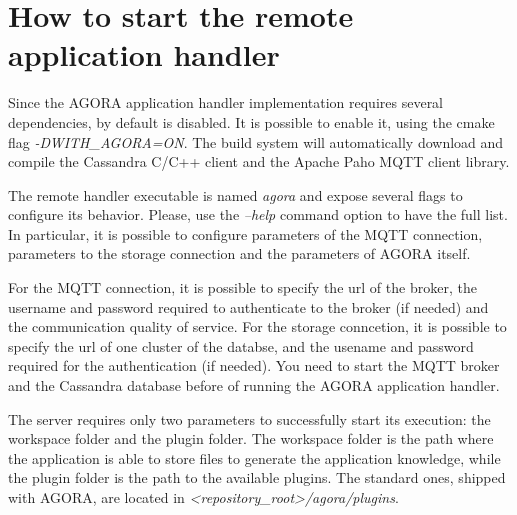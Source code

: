 \section{How to start the remote application handler}

Since the AGORA application handler implementation requires several dependencies, by default is disabled.
It is possible to enable it, using the cmake flag \textit{-DWITH\_AGORA=ON}.
The build system will automatically download and compile the Cassandra C/C++ client and the Apache Paho MQTT client library.

The remote handler executable is named \textit{agora} and expose several flags to configure its behavior.
Please, use the \textit{--help} command option to have the full list.
In particular, it is possible to configure parameters of the MQTT connection, parameters to the storage connection and the parameters of AGORA itself.

For the MQTT connection, it is possible to specify the url of the broker, the username and password required to authenticate to the broker (if needed) and the communication quality of service.
For the storage conncetion, it is possible to specify the url of one cluster of the databse, and the usename and password required for the authentication (if needed).
You need to start the MQTT broker and the Cassandra database before of running the AGORA application handler.

The server requires only two parameters to successfully start its execution: the workspace folder and the plugin folder.
The workspace folder is the path where the application is able to store files to generate the application knowledge, while the plugin folder is the path to the available plugins.
The standard ones, shipped with AGORA, are located in \textit{<repository\_root>/agora/plugins}.
